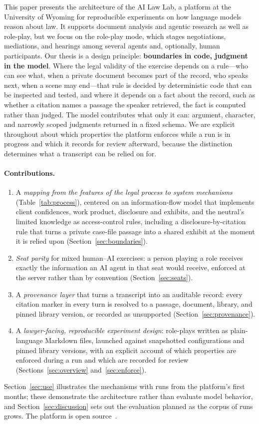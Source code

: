 \documentclass[acmsmall,screen,review]{acmart}
\newcommand{\lab}{AI Law Lab\xspace}
\begin{document}
This paper presents the architecture of the \lab, a platform at the University of Wyoming for reproducible experiments on how language models reason about law. It supports document analysis and agentic research as well as role-play, but we focus on the role-play mode, which stages negotiations, mediations, and hearings among several agents and, optionally, human participants. Our thesis is a design principle: \textbf{boundaries in code, judgment in the model}. Where the legal validity of the exercise depends on a rule---who can see what, when a private document becomes part of the record, who speaks next, when a scene may end---that rule is decided by deterministic code that can be inspected and tested, and where it depends on a fact about the record, such as whether a citation names a passage the speaker retrieved, the fact is computed rather than judged. The model contributes what only it can: argument, character, and narrowly scoped judgments returned in a fixed schema. We are explicit throughout about which properties the platform enforces while a run is in progress and which it records for review afterward, because the distinction determines what a transcript can be relied on for.

\paragraph{Contributions.}
\begin{enumerate}
  \item A \emph{mapping from the features of the legal process to system mechanisms} (Table~\ref{tab:process}), centered on an information-flow model that implements client confidences, work product, disclosure and exhibits, and the neutral's limited knowledge as access-control rules, including a disclosure-by-citation rule that turns a private case-file passage into a shared exhibit at the moment it is relied upon (Section~\ref{sec:boundaries}).
  \item \emph{Seat parity} for mixed human--AI exercises: a person playing a role receives exactly the information an AI agent in that seat would receive, enforced at the server rather than by convention (Section~\ref{sec:seats}).
  \item A \emph{provenance layer} that turns a transcript into an auditable record: every citation marker in every turn is resolved to a passage, document, library, and pinned library version, or recorded as unsupported (Section~\ref{sec:provenance}).
  \item A \emph{lawyer-facing, reproducible experiment design}: role-plays written as plain-language Markdown files, launched against snapshotted configurations and pinned library versions, with an explicit account of which properties are enforced during a run and which are recorded for review (Sections~\ref{sec:overview} and~\ref{sec:enforce}).
\end{enumerate}
Section~\ref{sec:use} illustrates the mechanisms with runs from the platform's first months; these demonstrate the architecture rather than evaluate model behavior, and Section~\ref{sec:discussion} sets out the evaluation planned as the corpus of runs grows. The platform is open source~\cite{ailawlab2026repo}.
\end{document}
